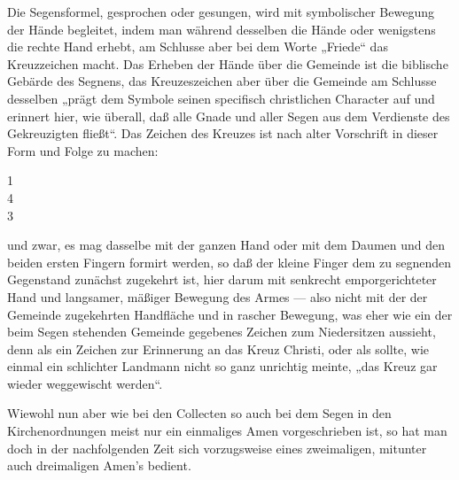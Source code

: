 Die Segensformel, gesprochen oder gesungen, wird mit symbolischer Bewegung der Hände begleitet, indem man während desselben die Hände oder wenigstens die rechte Hand erhebt, am Schlusse aber bei dem Worte „Friede“ das Kreuzzeichen macht. Das Erheben der Hände über die Gemeinde ist die biblische Gebärde des Segnens, das Kreuzeszeichen aber über die Gemeinde am Schlusse desselben „prägt dem Symbole seinen specifisch christlichen Character auf und erinnert hier, wie überall, daß alle Gnade und aller
Segen aus dem Verdienste des Gekreuzigten fließt“. Das Zeichen des Kreuzes ist nach alter Vorschrift in dieser Form und Folge zu machen:

\begin{center}
1\\
4\\
3
\end{center}

und zwar, es mag dasselbe mit der ganzen Hand oder mit dem Daumen und den beiden ersten Fingern formirt werden, so daß der kleine Finger dem zu segnenden Gegenstand zunächst zugekehrt ist, hier darum mit senkrecht emporgerichteter Hand und langsamer, mäßiger Bewegung des Armes — also nicht mit der der Gemeinde zugekehrten Handfläche und in rascher Bewegung, was eher wie ein der beim Segen stehenden Gemeinde gegebenes Zeichen zum Niedersitzen aussieht, denn als ein Zeichen zur Erinnerung an das Kreuz Christi, oder als sollte, wie einmal ein schlichter Landmann nicht so ganz unrichtig meinte, „das Kreuz gar wieder weggewischt werden“.

Wiewohl nun aber wie bei den Collecten so auch bei dem Segen in den Kirchenordnungen meist nur ein einmaliges Amen vorgeschrieben ist, so hat man doch in der nachfolgenden Zeit sich vorzugsweise eines zweimaligen, mitunter auch dreimaligen Amen’s bedient.


